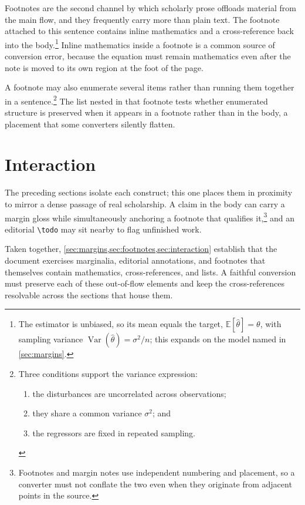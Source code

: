 \documentclass[11pt]{article}
\begin{document}
Footnotes are the second channel by which scholarly prose offloads material from
the main flow, and they frequently carry more than plain text. The footnote
attached to this sentence contains inline mathematics and a cross-reference back
into the body.\footnote{The estimator is unbiased, so its mean equals the target,
$\mathbb{E}[\hat{\theta}] = \theta$, with sampling variance
$\operatorname{Var}(\hat{\theta}) = \sigma^{2}/n$; this expands on the model named
in \cref{sec:margins}.} Inline mathematics inside a footnote is a common source of
conversion error, because the equation must remain mathematics even after the note
is moved to its own region at the foot of the page.

A footnote may also enumerate several items rather than running them together in a
sentence.\footnote{Three conditions support the variance expression: %
\begin{enumerate}[label=(\roman*),nosep,leftmargin=*]
  \item the disturbances are uncorrelated across observations;
  \item they share a common variance $\sigma^{2}$; and
  \item the regressors are fixed in repeated sampling.
\end{enumerate}}
The list nested in that footnote tests whether enumerated structure is preserved
when it appears in a footnote rather than in the body, a placement that some
converters silently flatten.

\section{Interaction}
\label{sec:interaction}

The preceding sections isolate each construct; this one places them in proximity
to mirror a dense passage of real scholarship. A claim in the body
can carry a margin gloss while simultaneously anchoring a footnote that qualifies
it,\footnote{Footnotes and margin notes use independent numbering and placement,
so a converter must not conflate the two even when they originate from adjacent
points in the source.} and an editorial \verb|\todo| may sit nearby to flag
unfinished work.


Taken together, \cref{sec:margins,sec:footnotes,sec:interaction} establish that
the document exercises marginalia, editorial annotations, and footnotes that
themselves contain mathematics, cross-references, and lists. A faithful
conversion must preserve each of these out-of-flow elements and keep the
cross-references resolvable across the sections that house them.
\end{document}
